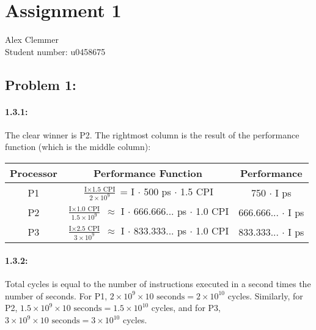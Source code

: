 \documentclass[a4paper]{article}
\begin{document}
\section*{Assignment 1 }
Alex Clemmer\\
Student number: u0458675

\subsection*{Problem 1:}
\paragraph*{1.3.1:} The clear winner is P2. The rightmost column is the result of the performance function (which is the middle column):

\begin{center}
\begin{tabular}{|c|c|c|c|c|}
\hline
Processor & \multicolumn{2}{|c|}{Performance Function} & \multicolumn{2}{|c|}{Performance}\\
\hline
P1 & \multicolumn{2}{|c|}{$\frac{\mbox{I} \times \mbox{1.5 CPI}}{2\times10^{9}}$ = I $\cdot$ 500 ps $\cdot$ 1.5 CPI} & \multicolumn{2}{|c|}{750 $\cdot$ I ps}\\
\hline
P2 & \multicolumn{2}{|c|}{$\frac{\mbox{I} \times \mbox{1.0 CPI}}{1.5\times10^{9}}$ $\approx$ I $\cdot$ 666.666... ps $\cdot$ 1.0 CPI} & \multicolumn{2}{|c|}{666.666... $\cdot$ I ps}\\
\hline
P3 & \multicolumn{2}{|c|}{$\frac{\mbox{I} \times \mbox{2.5 CPI}}{3\times10^{9}}$ $\approx$ I $\cdot$ 833.333... ps $\cdot$ 1.0 CPI} & \multicolumn{2}{|c|}{833.333... $\cdot$ I ps}\\
\hline
\end{tabular}
\end{center}

\paragraph*{1.3.2:} Total cycles is equal to the number of instructions executed in a second times the number of seconds. For P1, $2\times10^9 \times \mbox{10 seconds} =  2\times10^{10}$ cycles. Similarly, for P2, $1.5\times10^9 \times \mbox{10 seconds} = 1.5\times10^{10}$ cycles, and for P3, $3\times10^9 \times \mbox{10 seconds} = 3\times10^{10}$ cycles.
\end{document}
